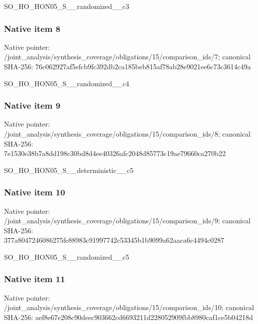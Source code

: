 \documentclass[10pt,a4paper]{article}
\begin{document}
\begingroup\raggedright\sloppy SO\_\allowbreak{}HO\_\allowbreak{}HON05\_\allowbreak{}S\_\allowbreak{}\_\allowbreak{}randomized\_\allowbreak{}\_\allowbreak{}c3\par\endgroup

\subsubsection{Native item 8}
Native pointer: /joint\_\allowbreak{}analysis/synthesis\_\allowbreak{}coverage/obligations/15/comparison\_\allowbreak{}ids/7; canonical SHA-256: 76c062927af5efcb9fc392db2ca185beb815af78ab28e9021ee6c73c3614c49a

\begingroup\raggedright\sloppy SO\_\allowbreak{}HO\_\allowbreak{}HON05\_\allowbreak{}S\_\allowbreak{}\_\allowbreak{}randomized\_\allowbreak{}\_\allowbreak{}c4\par\endgroup

\subsubsection{Native item 9}
Native pointer: /joint\_\allowbreak{}analysis/synthesis\_\allowbreak{}coverage/obligations/15/comparison\_\allowbreak{}ids/8; canonical SHA-256: 7e1530e38b7a8dd198c30bd8d4ee40326afc2048d85773c19ae79660ca270b22

\begingroup\raggedright\sloppy SO\_\allowbreak{}HO\_\allowbreak{}HON05\_\allowbreak{}S\_\allowbreak{}\_\allowbreak{}deterministic\_\allowbreak{}\_\allowbreak{}c5\par\endgroup

\subsubsection{Native item 10}
Native pointer: /joint\_\allowbreak{}analysis/synthesis\_\allowbreak{}coverage/obligations/15/comparison\_\allowbreak{}ids/9; canonical SHA-256: 377a8047246086275fe88983c91997742c53345b1b9099a62aaca6c4494c0287

\begingroup\raggedright\sloppy SO\_\allowbreak{}HO\_\allowbreak{}HON05\_\allowbreak{}S\_\allowbreak{}\_\allowbreak{}randomized\_\allowbreak{}\_\allowbreak{}c5\par\endgroup

\subsubsection{Native item 11}
Native pointer: /joint\_\allowbreak{}analysis/synthesis\_\allowbreak{}coverage/obligations/15/comparison\_\allowbreak{}ids/10; canonical SHA-256: aef8e67e208c90deec903662cd6693211d228052909fbb8980caf1ce5b04218d
\end{document}
